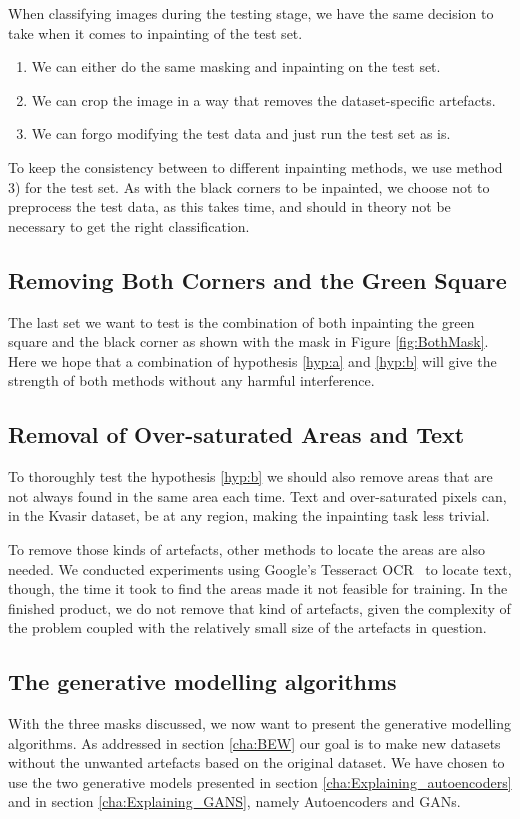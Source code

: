 When classifying images during the testing stage, we have the same decision to take when it comes to inpainting of the test set.
\begin{enumerate}
\item We can either do the same masking and inpainting on the test set. 
\item We can crop the image in a way that removes the dataset-specific artefacts.
\item We can forgo modifying the test data and just run the test set as is. 
\end{enumerate}

To keep the consistency between to different inpainting methods, we use method 3) for the test set.
As with the black corners to be inpainted, we choose not to preprocess the test data, as this takes time, and should in theory not be necessary to get the right classification.
 

\subsection{Removing Both Corners and the Green Square}
The last set we want to test is the combination of both inpainting the green square and the black corner as shown with the mask in Figure \ref{fig:BothMask}. 
Here we hope that a combination of hypothesis \ref{hyp:a} and \ref{hyp:b} will give the strength of both methods without any harmful interference. 

\subsection{Removal of Over-saturated Areas and Text}
To thoroughly test the hypothesis \ref{hyp:b} we should also remove areas that are not always found in the same area each time. Text and over-saturated pixels can, in the Kvasir dataset, be at any region, making the inpainting task less trivial. 

To remove those kinds of artefacts, other methods to locate the areas are also needed. We conducted experiments using Google's Tesseract OCR~\cite{smith2007overview} to locate text, though, the time it took to find the areas made it not feasible for training. 
In the finished product, we do not remove that kind of artefacts, given the complexity of the problem coupled with the relatively small size of the artefacts in question.

\subsection{The generative modelling algorithms}
With the three masks discussed, we now want to present the generative modelling algorithms. As addressed in section \ref{cha:BEW} our goal is to make new datasets without the unwanted artefacts based on the original dataset. 
We have chosen to use the two generative models presented in section \ref{cha:Explaining_autoencoders} and in section \ref{cha:Explaining_GANS}, namely Autoencoders and GANs.


